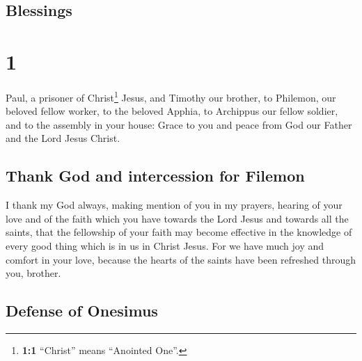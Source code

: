 \hypertarget{blessings}{%
\subsection{Blessings}\label{blessings}}

\hypertarget{section}{%
\section{1}\label{section}}

 Paul, a prisoner of Christ\footnote{\textbf{1:1}
  ``Christ'' means ``Anointed One''.} Jesus, and Timothy our brother, to
Philemon, our beloved fellow worker,  to the beloved
Apphia, to Archippus our fellow soldier, and to the assembly in your
house:  Grace to you and peace from God our Father and the
Lord Jesus Christ.

\hypertarget{thank-god-and-intercession-for-filemon}{%
\subsection{Thank God and intercession for
Filemon}\label{thank-god-and-intercession-for-filemon}}

 I thank my God always, making mention of you in my
prayers,  hearing of your love and of the faith which you
have towards the Lord Jesus and towards all the saints, 
that the fellowship of your faith may become effective in the knowledge
of every good thing which is in us in Christ Jesus.  For
we have much joy and comfort in your love, because the hearts of the
saints have been refreshed through you, brother.

\hypertarget{defense-of-onesimus}{%
\subsection{Defense of Onesimus}\label{defense-of-onesimus}}


